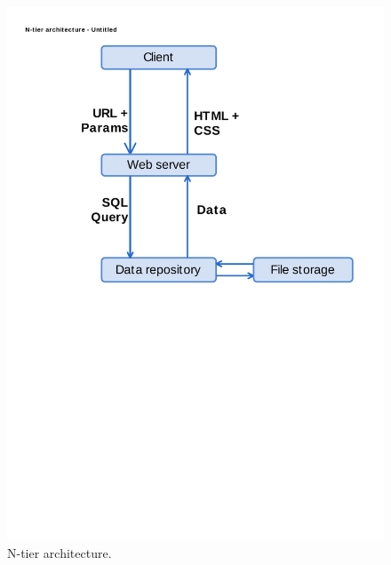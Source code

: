 \begin{figure}
                \includegraphics[scale=0.35]{img/ntier.pdf}
                \caption{N-tier architecture.}
                \label{img:arch-ntier}
\end{figure}

